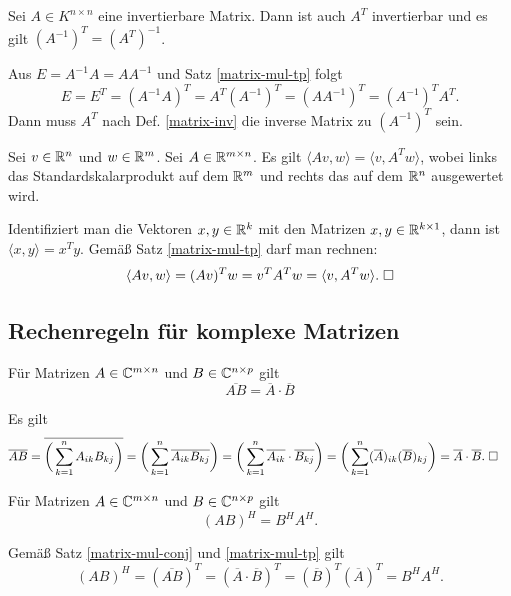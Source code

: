 \begin{Satz}
Sei $A\in K^{n\times n}$ eine invertierbare Matrix. Dann ist auch
$A^T$ invertierbar und es gilt $(A^{-1})^T = (A^T)^{-1}$.
\end{Satz}
\begin{Beweis}
Aus $E=A^{-1}A=AA^{-1}$ und Satz \ref{matrix-mul-tp} folgt
\begin{equation}
E = E^T = (A^{-1}A)^T = A^T (A^{-1})^T = (AA^{-1})^T = (A^{-1})^T A^T.
\end{equation}
Dann muss $A^T$ nach Def. \ref{matrix-inv} die inverse Matrix
zu $(A^{-1})^T$ sein.\;\qedsymbol
\end{Beweis}

\newpage
\begin{Satz}\label{Verschiebungseigenschaft}
Sei $v\in\mathbb R^n$ und $w\in\mathbb R^m$. Sei $A\in\mathbb R^{m\times n}$. Es gilt
$\langle Av,w\rangle = \langle v,A^Tw\rangle$,
wobei links das Standardskalarprodukt auf dem $\mathbb R^m$ und
rechts das auf dem $\mathbb R^n$ ausgewertet wird.
\end{Satz}
\begin{Beweis}
Identifiziert man die Vektoren $x,y\in\mathbb R^k$ mit den
Matrizen $x,y\in\mathbb R^{k\times 1}$, dann
ist $\langle x,y\rangle = x^T y$. Gemäß Satz
\ref{matrix-mul-tp} darf man rechnen:
\[\langle Av,w\rangle
= (Av)^T w = v^T A^T w = \langle v,A^Tw\rangle.\;\square\]
\end{Beweis}

\subsection{Rechenregeln für komplexe Matrizen}
\begin{Satz}\label{matrix-mul-conj}
Für Matrizen $A\in\mathbb C^{m\times n}$ und $B\in\mathbb C^{n\times p}$ gilt
\[\overline{AB} = \overline A\cdot\overline B\]
\end{Satz}
\begin{Beweis}
Es gilt
\begin{align*}
\overline{AB}
&= \overline{\bigg(\sum_{k=1}^n A_{ik}B_{kj}\bigg)}
= \bigg(\sum_{k=1}^n \overline{A_{ik}B_{kj}}\bigg)
= \bigg(\sum_{k=1}^n \overline{A_{ik}}\cdot\overline{B_{kj}}\bigg)
= \bigg(\sum_{k=1}^n (\overline A)_{ik}(\overline B)_{kj}\bigg)
= \overline A\cdot\overline B.\;\square
\end{align*}
\end{Beweis}

\begin{Satz}\label{matrix-mul-tp-conj}
Für Matrizen $A\in\mathbb C^{m\times n}$ und $B\in\mathbb C^{n\times p}$ gilt
\[(AB)^H = B^H A^H.\]
\end{Satz}
\begin{Beweis}
Gemäß Satz \ref{matrix-mul-conj} und \ref{matrix-mul-tp} gilt
\[(AB)^H = (\overline{AB})^T = (\overline A\cdot\overline B)^T
= (\overline B)^T(\overline A)^T = B^H A^H.\]
\end{Beweis}

